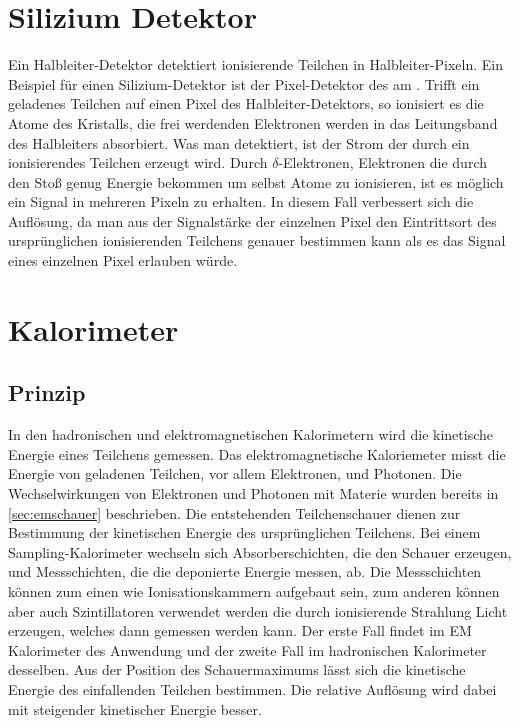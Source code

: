 \section{Silizium Detektor}
Ein Halbleiter-Detektor detektiert ionisierende Teilchen in Halbleiter-Pixeln. Ein Beispiel für einen Silizium-Detektor ist der Pixel-Detektor des \atlas am \lhc. 
Trifft ein geladenes Teilchen auf einen Pixel des Halbleiter-Detektors, so ionisiert es die Atome des Kristalls, die frei werdenden Elektronen werden in das Leitungsband des Halbleiters absorbiert. Was man detektiert, ist der Strom der durch ein ionisierendes Teilchen erzeugt wird. Durch $\delta$-Elektronen, Elektronen die durch den Stoß genug Energie bekommen um selbst Atome zu ionisieren, ist es möglich ein Signal in mehreren Pixeln zu erhalten. In diesem Fall verbessert sich die Auflösung, da man aus der Signalstärke der einzelnen Pixel den Eintrittsort des ursprünglichen ionisierenden Teilchens genauer bestimmen kann als es das Signal eines einzelnen Pixel erlauben würde.
\section{Kalorimeter}\label{sec:calori}
\subsection{Prinzip}
In den hadronischen und elektromagnetischen Kalorimetern wird die kinetische Energie eines Teilchens gemessen. Das elektromagnetische Kaloriemeter misst die Energie von geladenen Teilchen, vor allem Elektronen, und Photonen. Die Wechselwirkungen von Elektronen und Photonen mit Materie wurden bereits in \ref{sec:emschauer} beschrieben. Die entstehenden Teilchenschauer dienen zur Bestimmung der kinetischen Energie des ursprünglichen Teilchens. Bei einem Sampling-Kalorimeter wechseln sich Absorberschichten, die den Schauer erzeugen, und Messschichten, die die deponierte Energie messen, ab. Die Messschichten können zum einen wie Ionisationskammern aufgebaut sein, zum anderen können aber auch Szintillatoren verwendet werden die durch ionisierende Strahlung Licht erzeugen, welches dann gemessen werden kann. Der erste Fall findet im EM Kalorimeter des \atlas Anwendung und der zweite Fall im hadronischen Kalorimeter desselben. Aus der Position des Schauermaximums lässt sich die kinetische Energie des einfallenden Teilchen bestimmen. 
Die relative Auflösung wird dabei mit steigender kinetischer Energie besser.
